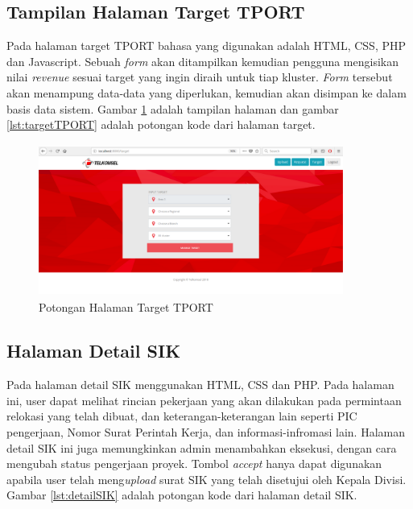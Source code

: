 

\subsection{Tampilan Halaman Target TPORT}
Pada halaman target TPORT bahasa yang digunakan adalah HTML, CSS, PHP dan Javascript. Sebuah \textit{form} akan ditampilkan kemudian pengguna mengisikan nilai \textit{revenue} sesuai target yang ingin diraih untuk tiap kluster. \textit{Form} tersebut akan menampung data-data yang diperlukan, kemudian akan disimpan ke dalam basis data sistem. Gambar \ref{figure:targetTPORT} adalah tampilan halaman dan gambar \ref{lst:targetTPORT} adalah potongan kode dari halaman target.



\begin{figure}[h!]
	\centerline
	{\includegraphics[width=10cm,height=5cm]{bab5/tampilanTarget.png}}
	\caption{Potongan Halaman Target TPORT}
	\label{figure:targetTPORT}
\end{figure}

\subsection{Halaman Detail SIK}
Pada halaman detail SIK menggunakan HTML, CSS dan PHP. Pada halaman ini, user dapat melihat rincian pekerjaan yang akan dilakukan pada permintaan relokasi yang telah dibuat, dan keterangan-keterangan lain seperti PIC pengerjaan, Nomor Surat Perintah Kerja, dan informasi-infromasi lain. Halaman detail SIK ini juga memungkinkan admin menambahkan eksekusi, dengan cara mengubah status pengerjaan proyek. Tombol \textit{accept} hanya dapat digunakan apabila user telah meng\textit{upload} surat SIK yang telah disetujui oleh Kepala Divisi. Gambar \ref{lst:detailSIK} adalah potongan kode dari halaman detail SIK.

